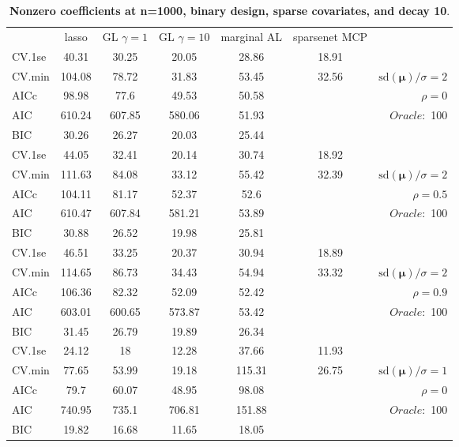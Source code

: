 \begin{table}\vspace{-.5cm}
\caption[l]{ { \bf Nonzero coefficients at n=1000, binary design, 
sparse covariates, and  decay  10}.}
\vspace{-.5cm}
\footnotesize{}
\begin{center}
\begin{tabular}{l*{5}{c}|r}
& lasso & GL $\gamma=1$ & GL $\gamma=10$ & marginal AL & sparsenet MCP  & \\
 \cline{1-7}
CV.1se & 40.31 & 30.25 & 20.05 & 28.86 & 18.91 & \\
CV.min & 104.08 & 78.72 & 31.83 & 53.45 & 32.56 &  $\mathrm{sd}(\mathbf{\mu})/\sigma=2$ \\
AICc & 98.98 & 77.6 & 49.53 & 50.58 & & $\rho=0$ \\
AIC & 610.24 & 607.85 & 580.06 & 51.93 & &  \multirow{2}{*}{$Oracle: $ 100} \\
BIC & 30.26 & 26.27 & 20.03 & 25.44 & &  \\
 \hline 
CV.1se & 44.05 & 32.41 & 20.14 & 30.74 & 18.92 & \\
CV.min & 111.63 & 84.08 & 33.12 & 55.42 & 32.39 &  $\mathrm{sd}(\mathbf{\mu})/\sigma=2$ \\
AICc & 104.11 & 81.17 & 52.37 & 52.6 & & $\rho=0.5$ \\
AIC & 610.47 & 607.84 & 581.21 & 53.89 & &  \multirow{2}{*}{$Oracle: $ 100} \\
BIC & 30.88 & 26.52 & 19.98 & 25.81 & &  \\
 \hline 
CV.1se & 46.51 & 33.25 & 20.37 & 30.94 & 18.89 & \\
CV.min & 114.65 & 86.73 & 34.43 & 54.94 & 33.32 &  $\mathrm{sd}(\mathbf{\mu})/\sigma=2$ \\
AICc & 106.36 & 82.32 & 52.09 & 52.42 & & $\rho=0.9$ \\
AIC & 603.01 & 600.65 & 573.87 & 53.42 & &  \multirow{2}{*}{$Oracle: $ 100} \\
BIC & 31.45 & 26.79 & 19.89 & 26.34 & &  \\
 \hline 
CV.1se & 24.12 & 18 & 12.28 & 37.66 & 11.93 & \\
CV.min & 77.65 & 53.99 & 19.18 & 115.31 & 26.75 &  $\mathrm{sd}(\mathbf{\mu})/\sigma=1$ \\
AICc & 79.7 & 60.07 & 48.95 & 98.08 & & $\rho=0$ \\
AIC & 740.95 & 735.1 & 706.81 & 151.88 & &  \multirow{2}{*}{$Oracle: $ 100} \\
BIC & 19.82 & 16.68 & 11.65 & 18.05 & &  \\

\end{tabular}
\end{center}
\end{table}
